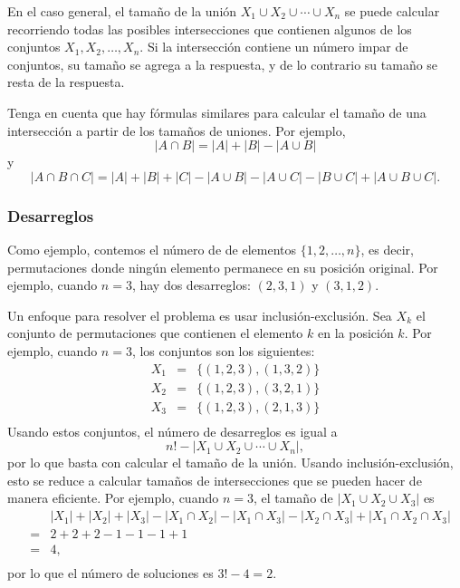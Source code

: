 En el caso general, el tamaño de la 
unión $X_1 \cup X_2 \cup \cdots \cup X_n$
se puede calcular recorriendo todas las posibles
intersecciones que contienen algunos de los conjuntos $X_1,X_2,\ldots,X_n$.
Si la intersección contiene un número impar de conjuntos,
su tamaño se agrega a la respuesta,
y de lo contrario su tamaño se resta de la respuesta.

Tenga en cuenta que hay fórmulas similares
para calcular
el tamaño de una intersección a partir de los tamaños de
uniones. Por ejemplo,
\[ |A \cap B| = |A| + |B| - |A \cup B|\]
y
\[ |A \cap B \cap C| = |A| + |B| + |C| - |A \cup B|  - |A \cup C|  - |B \cup C| + |A \cup B \cup C| .\]

\subsubsection{Desarreglos}


Como ejemplo, contemos el número de 
de elementos $\{1,2,\ldots,n\}$, es decir, permutaciones
donde ningún elemento permanece en su posición original.
Por ejemplo, cuando $n=3$, hay
dos desarreglos: $(2,3,1)$ y $(3,1,2)$.

Un enfoque para resolver el problema es usar
inclusión-exclusión.
Sea $X_k$ el conjunto de permutaciones
que contienen el elemento $k$ en la posición $k$.
Por ejemplo, cuando $n=3$, los conjuntos son los siguientes:
\[
\begin{array}{lcl}
X_1 & = & \{(1,2,3),(1,3,2)\} \\
X_2 & = & \{(1,2,3),(3,2,1)\} \\
X_3 & = & \{(1,2,3),(2,1,3)\} \\
\end{array}
\]
Usando estos conjuntos, el número de desarreglos es igual a
\[ n! - |X_1 \cup X_2 \cup \cdots \cup X_n|, \]
por lo que basta con calcular el tamaño de la unión.
Usando inclusión-exclusión, esto se reduce a
calcular tamaños de intersecciones que se pueden
hacer de manera eficiente.
Por ejemplo, cuando $n=3$, el tamaño de
$|X_1 \cup X_2 \cup X_3|$ es
\[
\begin{array}{lcl}
 & & |X_1| + |X_2| + |X_3| - |X_1 \cap X_2|  - |X_1 \cap X_3|  - |X_2 \cap X_3| + |X_1 \cap X_2 \cap X_3| \\
 & = & 2+2+2-1-1-1+1 \\
 & = & 4, \\
\end{array}
\]
por lo que el número de soluciones es $3!-4=2$.


